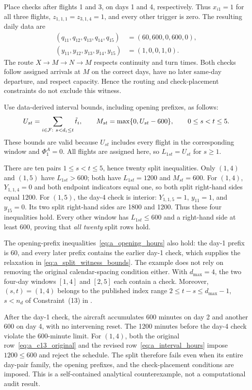 Place checks after flights 1 and 3, on days 1 and 4, respectively. Thus
$x_{i1}=1$ for all three flights, $z_{1,1,1}=z_{3,1,4}=1$, and every other
trigger is zero. The resulting daily data are
\begin{align}
  (q_{11},q_{12},q_{13},q_{14},q_{15})&=(60,600,0,600,0),
    \label{eq:a_split_witness_hours}\\
  (y_{11},y_{12},y_{13},y_{14},y_{15})&=(1,0,0,1,0).
    \label{eq:a_split_witness_checks}
\end{align}
The route $X\to M\to N\to M$ respects continuity and turn times. Both
checks follow assigned arrivals at $M$ on the correct days, have no later
same-day departure, and respect capacity. Hence the routing and
check-placement constraints do not exclude this witness.

Use data-derived interval bounds, including opening prefixes, as follows:
\begin{equation}\label{eq:a_split_witness_bounds}
  U_{st}=\sum_{i\in\mathcal{F}:\ s<d_i\le t}\tilde t_i,
  \qquad M_{st}=\max\{0,U_{st}-600\},
  \qquad 0\le s<t\le5.
\end{equation}
These bounds are valid because $U_{st}$ includes every flight in the
corresponding window and $\Phi^A_1=0$. All flights are assigned here, so
$L_{1st}=U_{st}$ for $s\ge1$.

There are ten pairs $1\le s<t\le5$, hence twenty split inequalities.
Only $(1,4)$ and $(1,5)$ have $L_{1st}>600$; both have
$L_{1st}=1200$ and $M_{st}=600$. For $(1,4)$, $Y_{1,1,4}=0$ and both
endpoint indicators equal one, so both split right-hand sides equal 1200.
For $(1,5)$, the day-4 check is interior: $Y_{1,1,5}=1$, $y_{11}=1$, and
$y_{15}=0$. Its two split right-hand sides are 1800 and 1200. Thus these
four inequalities hold. Every other window has $L_{1st}\le600$ and a
right-hand side at least 600, proving that \emph{all twenty} split rows hold.

The opening-prefix inequalities~\eqref{eq:a_opening_hours} also hold:
the day-1 prefix is 60, and every later prefix contains the earlier day-1
check, which supplies the relaxation in \eqref{eq:a_split_witness_bounds}.
The example does not rely on removing the original calendar-spacing
condition either. With $d_{\max}=4$, the two four-day windows $[1,4]$ and
$[2,5]$ each contain a check. Moreover, $(s,t)=(1,4)$ belongs to the
published index range $2\le t-s\le d_{\max}-1$, $s<n_d$ of
Constraint~(13) in \citet{khaled2018compact}.

After the day-1 check, the aircraft accumulates 600 minutes on day 2 and
another 600 on day 4, with no intervening reset. The 1200 minutes before
the day-4 check violate the 600-minute limit. For $(1,4)$, both the original
row~\eqref{eq:a_c13_original} and the revised
row~\eqref{eq:a_interval_hours} impose $1200\le600$ and reject the
schedule. The split therefore fails even when its entire day-pair family,
the opening prefixes, and the check-placement conditions are imposed.
This is a self-contained analytical counterexample, not a computational
audit result.

